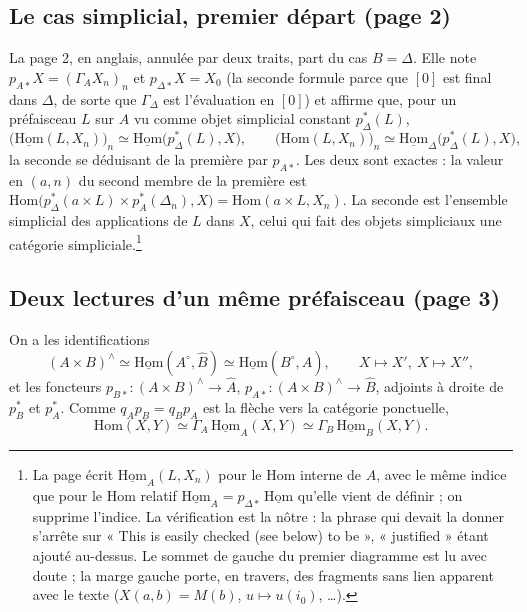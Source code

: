 \documentclass[11pt,a4paper]{article}
\begin{document}
\subsection*{Le cas simplicial, premier départ (page 2)}

La page 2, en anglais, annulée par deux traits, part du cas $B = \Delta$. Elle
note $p_{A*}X = (\Gamma_{A} X_{n})_{n}$ et $p_{\Delta*}X = X_{0}$ (la
seconde formule parce que $[0]$ est final dans $\Delta$, de sorte que $\Gamma_{\Delta}$ est l'évaluation en $[0]$) et affirme que, pour un préfaisceau $L$
sur $A$ vu comme objet simplicial constant $p_{\Delta}^{*}(L)$,
\[
\bigl(\underline{\mathrm{Hom}}(L, X_{n})\bigr)_{n} \simeq
\underline{\mathrm{Hom}}\bigl(p_{\Delta}^{*}(L), X\bigr),
\qquad
\bigl(\mathrm{Hom}(L, X_{n})\bigr)_{n} \simeq
\underline{\mathrm{Hom}}_{\Delta}\bigl(p_{\Delta}^{*}(L), X\bigr),
\]
la seconde se déduisant de la première par $p_{A*}$. Les deux sont exactes :
la valeur en $(a, n)$ du second membre de la première est
$\mathrm{Hom}\bigl(p_{\Delta}^{*}(a \times L) \times p_{A}^{*}(\Delta_{n}),
X\bigr) = \mathrm{Hom}(a \times L, X_{n})$. La seconde est l'ensemble
simplicial des applications de $L$ dans $X$, celui qui fait des objets
simpliciaux une catégorie simpliciale.\footnote{La page écrit
$\underline{\mathrm{Hom}}_{A}(L, X_{n})$ pour le Hom interne de $\widehat{A}$,
avec le même indice que pour le Hom relatif $\underline{\mathrm{Hom}}_{A} =
p_{\Delta*}\,\underline{\mathrm{Hom}}$ qu'elle vient de définir ; on supprime
l'indice. La vérification est la nôtre : la phrase qui devait la donner
s'arrête sur « This is easily checked (see below) to be », « justified » étant
ajouté au-dessus. Le sommet de gauche du premier diagramme est lu avec doute ;
la marge gauche porte, en travers, des fragments sans lien apparent avec le
texte ($X(a, b) = M(b)$, $u \mapsto u(i_{0})$, …).}

\subsection*{Deux lectures d'un même préfaisceau (page 3)}

On a les identifications
\[
(A \times B)^{\wedge} \simeq \underline{\mathrm{Hom}}(A^{\circ}, \widehat{B})
\simeq \underline{\mathrm{Hom}}(B^{\circ}, \widehat{A}),
\qquad X \mapsto X', \ X \mapsto X'',
\]
et les foncteurs $p_{B*} : (A \times B)^{\wedge} \to \widehat{A}$,
$p_{A*} : (A \times B)^{\wedge} \to \widehat{B}$, adjoints à droite de
$p_{B}^{*}$ et $p_{A}^{*}$. Comme $q_{A} p_{B} = q_{B} p_{A}$ est la flèche vers
la catégorie ponctuelle,
\[
\mathrm{Hom}(X, Y) \simeq \Gamma_{A}\, \underline{\mathrm{Hom}}_{A}(X, Y)
\simeq \Gamma_{B}\, \underline{\mathrm{Hom}}_{B}(X, Y).
\]
\end{document}

